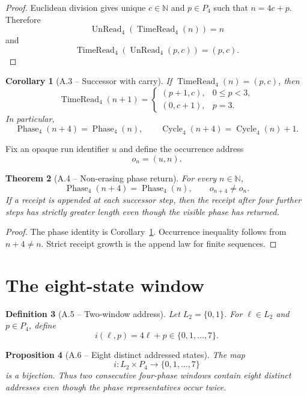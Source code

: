 \documentclass[11pt,letterpaper]{article}
\theoremstyle{relationstyle}
\newtheorem{theorem}{Theorem}[section]
\newtheorem{proposition}[theorem]{Proposition}
\newtheorem{corollary}[theorem]{Corollary}
\newtheorem{definition}[theorem]{Definition}
\newcommand{\N}{\mathbb{N}}
\newcommand{\Phase}{\operatorname{Phase}_4}
\newcommand{\Cycle}{\operatorname{Cycle}_4}
\newcommand{\TimeRead}{\operatorname{TimeRead}_4}
\newcommand{\UnRead}{\operatorname{UnRead}_4}
\begin{document}
\begin{proof}
Euclidean division gives unique $c\in\N$ and $p\in P_4$ such that $n=4c+p$.  Therefore
\[
\UnRead(\TimeRead(n))=n
\]
and
\[
\TimeRead(\UnRead(p,c))=(p,c).
\]
\end{proof}

\begin{corollary}[A.3 -- Successor with carry]\label{cor:carry}
If $\TimeRead(n)=(p,c)$, then
\[
\TimeRead(n+1)=
\begin{cases}
(p+1,c),&0\le p<3,\\
(0,c+1),&p=3.
\end{cases}
\]
In particular,
\[
\Phase(n+4)=\Phase(n),
\qquad
\Cycle(n+4)=\Cycle(n)+1.
\]
\end{corollary}

Fix an opaque run identifier $u$ and define the occurrence address
\[
o_n=(u,n).
\]

\begin{theorem}[A.4 -- Non-erasing phase return]\label{thm:phase-return}
For every $n\in\N$,
\[
\Phase(n+4)=\Phase(n),
\qquad
o_{n+4}\ne o_n.
\]
If a receipt is appended at each successor step, then the receipt after four further steps has strictly greater length even though the visible phase has returned.
\end{theorem}

\begin{proof}
The phase identity is Corollary~\ref{cor:carry}.  Occurrence inequality follows from $n+4\ne n$.  Strict receipt growth is the append law for finite sequences.
\end{proof}

\section{The eight-state window}\label{sec:eight}

\begin{definition}[A.5 -- Two-window address]
Let $L_2=\{0,1\}$.  For $\ell\in L_2$ and $p\in P_4$, define
\[
i(\ell,p)=4\ell+p\in\{0,1,\ldots,7\}.
\]
\end{definition}

\begin{proposition}[A.6 -- Eight distinct addressed states]\label{prop:eight}
The map
\[
i:L_2\times P_4\longrightarrow\{0,1,\ldots,7\}
\]
is a bijection.  Thus two consecutive four-phase windows contain eight distinct addresses even though the phase representatives occur twice.
\end{proposition}
\end{document}

